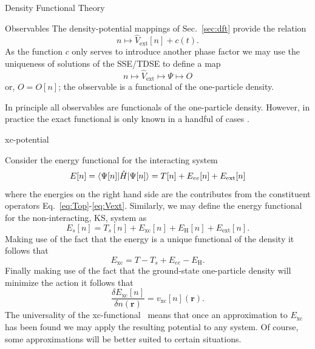 \documentclass[letterpaper, 12 pt]{report}
\begin{document}
\begin{chapter}{Density Functional Theory \label{chap:dft}}
\begin{section}{Observables \label{sec:obs}}
      The density-potential mappings of Sec.\ \ref{sec:dft} provide the relation
      \begin{equation} \label{eq:denpot}
         n \mapsto \hat{V}_\mathrm{ext}[n] + c(t).
      \end{equation}
      As the function $c$ only serves to introduce another phase factor we may use the uniqueness of
      solutions of the SSE/TDSE to define a map
      \begin{equation} \label{eq:obsfunc2}
         n \mapsto \hat{V}_\mathrm{ext} \mapsto \Psi \mapsto O
      \end{equation}
      or, $O = O[n]$; the observable is a functional of the one-particle density.

      In principle all observables are functionals of the one-particle density. However, in practice the
      exact functional is only known in a handful of cases \cite[p. 211-213]{obs_exac}.

   \end{section}

   \begin{section}{xc-potential \label{sec:xcpot}}

      Consider the energy functional for the interacting system
      \begin{equation} \label{eq:efunc}
         E[n] = \braket{\Psi[n] | \hat{H} | \Psi[n] }= T[n] + E_{ee}[n] + E_\mathrm{ext}[n]
      \end{equation}
      where the energies on the right hand side are the contributes from the constituent operators
      Eq.\ \eqref{eq:Top}-\eqref{eq:Vext}. Similarly, we may define the energy functional for the
      non-interacting, KS, system as
      \begin{equation} \label{eq:esfunc}
         E_s[n] =  T_s[n] + E_\mathrm{xc}[n] + E_\mathrm{H}[n] + E_\mathrm{ext}[n].
      \end{equation}
      Making use of the fact that the energy is a unique functional of the density it follows that
      \begin{equation} \label{eq:exc}
         E_\mathrm{xc} = T - T_s + E_{ee} - E_\mathrm{H}.
      \end{equation}
      Finally making use of the fact that the ground-state one-particle density will minimize the action
      it follows that
      \begin{equation} \label{eq:vxc-der}
         \frac{\delta E_\mathrm{xc}[n]}{\delta n(\mathbf{r})} = v_\mathrm{xc}[n](\mathbf{r}).
      \end{equation}
      The universality of the xc-functional~\cite{dft-engel} means that once an approximation to
      $E_\mathrm{xc}$ has been found we may apply the resulting potential to any system. Of course,
      some approximations will be better suited to certain situations.


\end{section}
\end{chapter}
\end{document}
